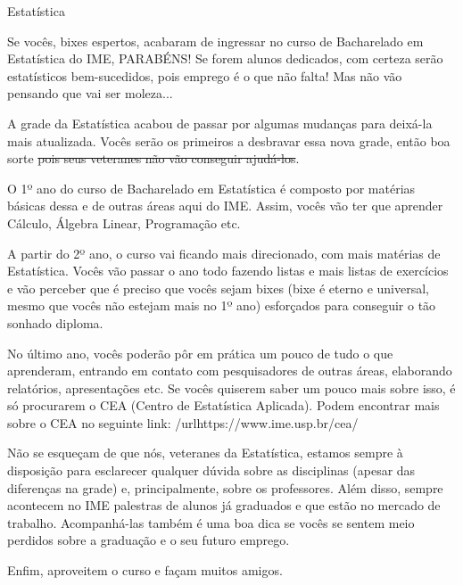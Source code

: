 \begin{subsecao}{Estatística}

Se vocês, bixes espertos, acabaram de ingressar no curso de Bacharelado em
Estatística do IME, PARABÉNS! Se forem alunos dedicados, com certeza serão
estatísticos bem-sucedidos, pois emprego é o que não falta! Mas não vão
pensando que vai ser moleza...

A grade da Estatística acabou de passar por algumas mudanças para deixá-la
mais atualizada. Vocês serão os primeiros a desbravar essa nova grade, então
boa sorte \sout{pois seus veteranes não vão conseguir ajudá-los}.

O 1º ano do curso de Bacharelado em Estatística é composto por matérias básicas
dessa e de outras áreas aqui do IME. Assim, vocês vão ter que aprender Cálculo,
Álgebra Linear, Programação etc.

A partir do 2º ano, o curso vai ficando mais direcionado, com mais matérias de
Estatística. Vocês vão passar o ano todo fazendo listas e mais listas de
exercícios e vão perceber que é preciso que vocês sejam bixes (bixe é eterno e
universal, mesmo que vocês não estejam mais no 1º ano) esforçados para conseguir o tão
sonhado diploma.

No último ano, vocês poderão pôr em prática um pouco de tudo o que
aprenderam, entrando em contato com pesquisadores de outras áreas, elaborando
relatórios, apresentações etc. Se vocês quiserem saber um pouco mais sobre
isso, é só procurarem o CEA (Centro de Estatística Aplicada). Podem encontrar
mais sobre o CEA no seguinte link: /url{https://www.ime.usp.br/cea/}

Não se esqueçam de que nós, veteranes da Estatística, estamos sempre à
disposição para esclarecer qualquer dúvida sobre as disciplinas (apesar
das diferenças na grade) e, principalmente, sobre os professores. Além disso,
sempre acontecem no IME palestras de alunos já graduados e que estão no
mercado de trabalho. Acompanhá-las também é uma boa dica se vocês se sentem meio
perdidos sobre a graduação e o seu futuro emprego.

Enfim, aproveitem o curso e façam muitos amigos.

\end{subsecao}
